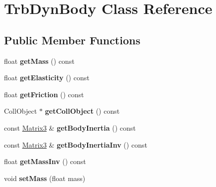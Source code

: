 \hypertarget{classTrbDynBody}{}\section{Trb\+Dyn\+Body Class Reference}
\label{classTrbDynBody}
\subsection*{Public Member Functions}
\begin{DoxyCompactItemize}
\item 
\mbox{\label{classTrbDynBody_a5cf4d76cac92cc694c2f9f7d992cae93}} 
float {\bfseries get\+Mass} () const
\item 
\mbox{\label{classTrbDynBody_a6206b9f6dbe93608140170f4c42fd23f}} 
float {\bfseries get\+Elasticity} () const
\item 
\mbox{\label{classTrbDynBody_aaf7fba06172899f050c5c99a3e8368e1}} 
float {\bfseries get\+Friction} () const
\item 
\mbox{\label{classTrbDynBody_ac93ec37adf65e7b67c897a6ec987a6cc}} 
Coll\+Object $\ast$ {\bfseries get\+Coll\+Object} () const
\item 
\mbox{\label{classTrbDynBody_a82095377cff88db6d2d61ecde4dfe4bc}} 
const \hyperlink{classVectormath_1_1Aos_1_1Matrix3}{Matrix3} \& {\bfseries get\+Body\+Inertia} () const
\item 
\mbox{\label{classTrbDynBody_a5ced739e0c9f73cc7b307bf0ec3c51ed}} 
const \hyperlink{classVectormath_1_1Aos_1_1Matrix3}{Matrix3} \& {\bfseries get\+Body\+Inertia\+Inv} () const
\item 
\mbox{\label{classTrbDynBody_a3fb3de1794f0085c11b98aefe4d7571e}} 
float {\bfseries get\+Mass\+Inv} () const
\item 
\mbox{\label{classTrbDynBody_a5676b47154e66a90eab40e00b5b69361}} 
void {\bfseries set\+Mass} (float mass)
\item 
\mbox{\label{classTrbDynBody_aa73a3217880970d4104f0a63dcfd1ad8}} 

\end{DoxyCompactItemize}
